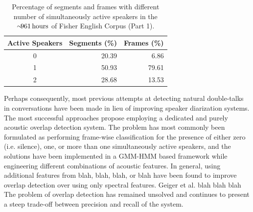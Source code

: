 \documentclass[a4paper]{article}
\begin{document}
\begin{table}[th] \label{tbl:actspk-perc}
  \caption{Percentage of segments and frames with different number of simultaneously active speakers in the $\sim \!\!\! \text{961\,hours}$ of Fisher English Corpus (Part 1).}
  \centering
  \begin{tabular}{crr}
    \toprule
    \textbf{Active Speakers}  & \textbf{Segments (\%)}  & \textbf{Frames (\%)}  \\ \midrule
    0                         & 20.39                   &  6.86                 \\
    1                         & 50.93                   & 79.61                 \\
    2                         & 28.68                   & 13.53                 \\
    \bottomrule
  \end{tabular}
  \vspace*{-\baselineskip}
\end{table}

Perhaps consequently, most previous attempts at detecting natural double-talks in conversations have been made in lieu of improving speaker diarization systems.
The most successful approaches propose employing a dedicated and purely acoustic overlap detection system.
The problem has most commonly been formulated as performing frame-wise classification for the presence of either
zero (i.e. silence), one, or more than one simultaneously active speakers,
and the solutions have been implemented in a GMM-HMM based framework while engineering different combinations of acoustic features.  %
In general, using additional features from blah, blah, blah, or blah %
have been found to improve overlap detection over using only spectral features.
Geiger et al. blah blah blah  %
The problem of overlap detection has remained unsolved
and continues to present a steep trade-off between precision and recall of the system.
\end{document}
